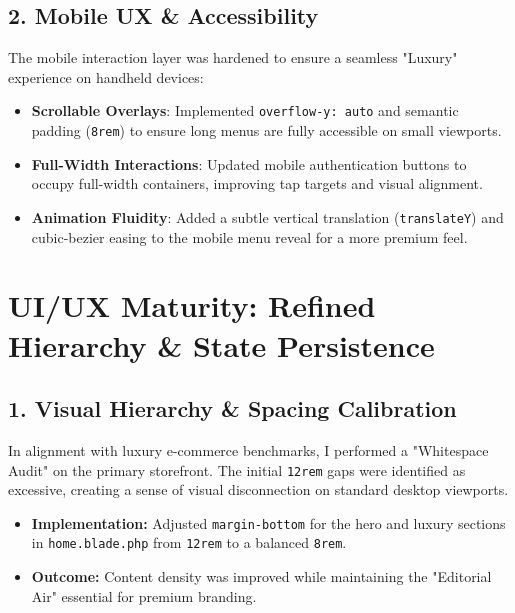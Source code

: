 \documentclass[12pt,a4paper]{article}
\begin{document}
\subsection{2. Mobile UX & Accessibility}

The mobile interaction layer was hardened to ensure a seamless "Luxury" experience on handheld devices:
\begin{itemize}
    \item \textbf{Scrollable Overlays}: Implemented \texttt{overflow-y: auto} and semantic padding (\texttt{8rem}) to ensure long menus are fully accessible on small viewports.
    \item \textbf{Full-Width Interactions}: Updated mobile authentication buttons to occupy full-width containers, improving tap targets and visual alignment.
    \item \textbf{Animation Fluidity}: Added a subtle vertical translation (\texttt{translateY}) and cubic-bezier easing to the mobile menu reveal for a more premium feel.
\end{itemize}

\section{UI/UX Maturity: Refined Hierarchy \& State Persistence}

\subsection{1. Visual Hierarchy \& Spacing Calibration}
In alignment with luxury e-commerce benchmarks, I performed a "Whitespace Audit" on the primary storefront. The initial \texttt{12rem} gaps were identified as excessive, creating a sense of visual disconnection on standard desktop viewports. 
\begin{itemize}
    \item \textbf{Implementation:} Adjusted \texttt{margin-bottom} for the hero and luxury sections in \texttt{home.blade.php} from \texttt{12rem} to a balanced \texttt{8rem}.
    \item \textbf{Outcome:} Content density was improved while maintaining the "Editorial Air" essential for premium branding.
\end{itemize}
\end{document}
